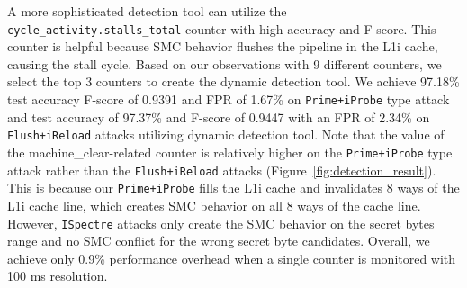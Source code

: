 A more sophisticated detection tool can utilize the \texttt{cycle\_activity.stalls\_total} counter with high accuracy and F-score. This counter is helpful because SMC behavior flushes the pipeline in the L1i cache, causing the stall cycle.
Based on our observations with 9 different counters, we select the top 3 counters to create the dynamic detection tool. We achieve 97.18\% test accuracy F-score of 0.9391 and FPR of 1.67\% on \texttt{Prime+iProbe} type attack and test accuracy of 97.37\% and F-score of 0.9447 with an FPR of 2.34\% on \texttt{Flush+iReload} attacks utilizing dynamic detection tool. Note that the value of the machine\_clear-related counter is relatively higher on the \texttt{Prime+iProbe} type attack rather than the \texttt{Flush+iReload} attacks (Figure~\ref{fig:detection_result}). This is because our \texttt{Prime+iProbe} fills the L1i cache and invalidates 8 ways of the L1i cache line, which creates SMC behavior on all 8 ways of the cache line. However, \texttt{ISpectre} attacks only create the SMC behavior on the secret bytes range and no SMC conflict for the wrong secret byte candidates. Overall, we achieve only 0.9\% performance overhead when a single counter is monitored with 100 ms resolution.


